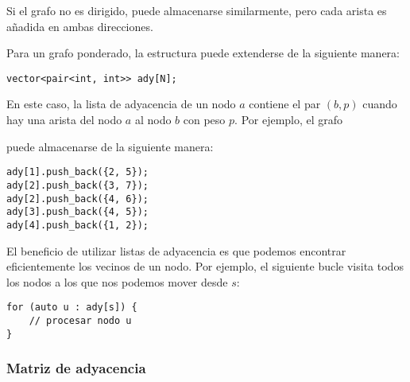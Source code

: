 Si el grafo no es dirigido, puede almacenarse similarmente,
pero cada arista es añadida en ambas direcciones.

Para un grafo ponderado, la estructura puede extenderse
de la siguiente manera:

\begin{lstlisting}
vector<pair<int, int>> ady[N];
\end{lstlisting}

En este caso, la lista de adyacencia de un nodo $a$
contiene el par $(b,p)$ cuando hay una arista del nodo $a$
al nodo $b$ con peso $p$. Por ejemplo, el grafo

\begin{center}
\end{center}

puede almacenarse de la siguiente manera:
\begin{lstlisting}
ady[1].push_back({2, 5});
ady[2].push_back({3, 7});
ady[2].push_back({4, 6});
ady[3].push_back({4, 5});
ady[4].push_back({1, 2});
\end{lstlisting}

El beneficio de utilizar listas de adyacencia es que
podemos encontrar eficientemente los vecinos de un nodo.
Por ejemplo, el siguiente bucle visita todos los nodos
a los que nos podemos mover desde $s$:

\begin{lstlisting}
for (auto u : ady[s]) {
    // procesar nodo u
}
\end{lstlisting}

\subsubsection{Matriz de adyacencia}

